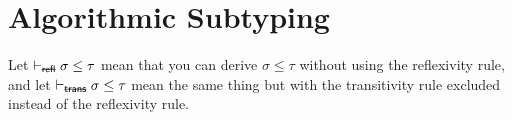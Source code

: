 \section{Algorithmic Subtyping}
\newcommand{\subtype}[2]{\vdash #1 \leq #2}
\newcommand{\subtypeNoRefl}[2]{\vdash_\text{\sout{\sf refl}} #1 \leq #2}
\newcommand{\subtypeNoTrans}[2]{\vdash_\text{\sout{\sf trans}} #1 \leq #2}
\newcommand{\asub}{\ensuremath{\vdash\!\!\!\!\raisebox{-.6ex}{\tikz\node[rotate=90]{\footnotesize$\blacktriangledown$};}}}
\newcommand{\algoSubtype}[2]{\asub #1 \leq #2}

Let $\subtypeNoRefl \sigma \tau$ mean that you can derive $\sigma \leq \tau$
without using the reflexivity rule, and let $\subtypeNoTrans \sigma \tau$ mean the same
thing but with the transitivity rule excluded instead of the reflexivity rule.

